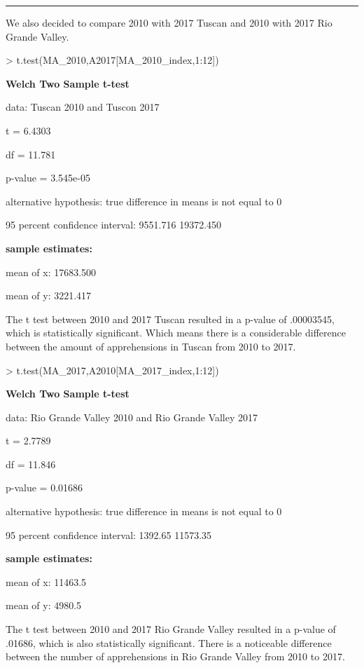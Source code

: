 \documentclass[letterpaper]{article}
\begin{document}
\noindent\rule{\textwidth}{0.4pt}
\medskip

We also decided to compare 2010 with 2017 Tuscan and 2010 with 2017 Rio Grande Valley.\par

\begin{Schunk}
\begin{Sinput}
> t.test(MA_2010,A2017[MA_2010_index,1:12])
\end{Sinput}
\end{Schunk}

\textbf{Welch Two Sample t-test}

data: Tuscan 2010 and Tuscon 2017\par
t = 6.4303\par
df = 11.781\par
p-value = 3.545e-05\par
alternative hypothesis: true difference in means is not equal to 0\par
95 percent confidence interval: 9551.716  19372.450\par
\par
\bigskip
\textbf{sample estimates:}\par
mean of x: 17683.500\par
mean of y: 3221.417\par
\bigskip

The t test between 2010 and 2017 Tuscan resulted in a p-value of .00003545, which is statistically significant. Which means there is a considerable difference between the amount of apprehensions in Tuscan from 2010 to 2017. 

\begin{Schunk}
\begin{Sinput}
> t.test(MA_2017,A2010[MA_2017_index,1:12])
\end{Sinput}
\end{Schunk}

\textbf{Welch Two Sample t-test}

data: Rio Grande Valley 2010 and Rio Grande Valley 2017\par
t = 2.7789\par
df = 11.846\par
p-value = 0.01686\par
alternative hypothesis: true difference in means is not equal to 0\par
95 percent confidence interval: 1392.65  11573.35\par
\par
\bigskip
\textbf{sample estimates:}\par
mean of x: 11463.5\par
mean of y: 4980.5 \par
\bigskip
The t test between 2010 and 2017 Rio Grande Valley resulted in a p-value of .01686, which is also statistically significant. There is a noticeable difference between the number of apprehensions in Rio Grande Valley from 2010 to 2017.
\end{document}
